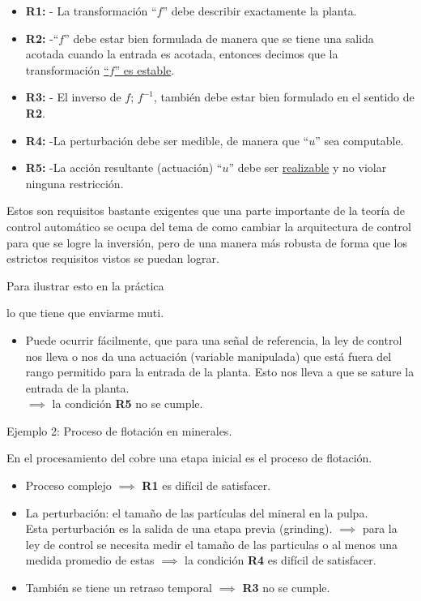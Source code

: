 \documentclass[a4paper]{article}
\begin{document}
\begin{itemize}
		\item \textbf{R1:} - La transformación ``$f$'' debe describir exactamente la planta.
		\item \textbf{R2:} -``$f$'' debe estar bien formulada de manera que se tiene una salida acotada cuando la entrada es acotada, entonces decimos que la transformación \underline{``$f$'' es estable}.
		\item \textbf{R3:} - El inverso de $f$; $f^{-1}$, también debe estar bien formulado en el sentido de \textbf{R2}.
		\item \textbf{R4:} -La perturbación debe ser medible, de manera que ``$u$'' sea computable.
		\item \textbf{R5:} -La acción resultante (actuación) ``$u$'' debe ser \underline{realizable} y no violar ninguna restricción.
\end{itemize}

Estos son requisitos bastante exigentes que una parte importante de la teoría de control automático se ocupa del tema de como cambiar la arquitectura de control para que se logre la inversión, pero de una manera más robusta de forma que los estrictos requisitos vistos se puedan lograr.

Para ilustrar esto en la práctica

lo que tiene que enviarme muti.

\begin{itemize}
\item Puede ocurrir fácilmente, que para una señal de referencia, la ley de control nos lleva o nos da una actuación (variable manipulada) que está fuera del rango permitido para la entrada de la planta. Esto nos lleva a que se sature la entrada de la planta.\\
$\implies$ la condición \textbf{R5} no se cumple.
\end{itemize}

Ejemplo 2: Proceso de flotación en minerales.

En el procesamiento del cobre una etapa inicial es el proceso de flotación.

\begin{itemize}
		\item Proceso complejo $\implies $ \textbf{R1} es difícil de satisfacer.
		\item La perturbación: el tamaño de las partículas del mineral en la pulpa.\\
				Esta perturbación es la salida de una etapa previa (grinding).
				$\implies $ para la ley de control se necesita medir el tamaño de las particulas o al menos una medida promedio de estas
				$\implies $ la condición \textbf{R4} es difícil de satisfacer.
		\item También se tiene un retraso temporal $\implies $ \textbf{R3} no se cumple.
\end{itemize}
\end{document}
